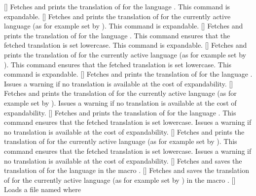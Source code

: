 \documentclass[load-preamble+,babel-options={french,spanish,ngerman,english}]{cnltx-doc}
\begin{document}
\begin{commands}
 \expandable{}[]
   Fetches and prints the translation of  for the language
   .  This command is expandable.
 \expandable{}[]
   Fetches and prints the translation of  for the currently active
   language (as for example set by ).  This command is expandable.
 \expandable{}[]
   Fetches and prints the translation of  for
   the language .  This command ensures that the fetched
   translation is set lowercase.  This command is expandable.
 \expandable{}[]
   Fetches and prints the translation of  for
   the currently active language (as for example set by ).  This
   command ensures that the fetched translation is set lowercase.  This
   command is expandable.
 []
   Fetches and prints the translation of  for
   the language .  Issues a warning if no translation is
   available at the cost of expandability.
 []
   Fetches and prints the translation of  for
   the currently active language (as for example set by ).
   Issues a warning if no translation is available at the cost of
   expandability.
 []
   Fetches and prints the translation of  for
   the language .  This command ensures that the fetched
   translation is set lowercase.  Issues a warning if no translation is
   available at the cost of expandability.
 []
   Fetches and prints the translation of  for
   the currently active language (as for example set by ).  This
   command ensures that the fetched translation is set lowercase.  Issues a
   warning if no translation is available at the cost of expandability.
 []
   Fetches and saves the translation of  for the language
    in the macro .
 []
   Fetches and saves the translation of  for the currently active
   language (as for example set by ) in the macro .
 []
   Loads a file named  where 

\end{commands}
\end{document}
